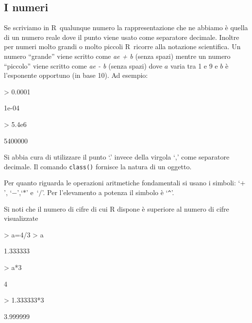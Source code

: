 \documentclass[onecolumn,11pt]{book}
\newcommand{\varia}[1]{\textsl{\textsf{#1}}}
\newcommand{\rpr}{\textsf{R}~}
\begin{document}
\subsection{I numeri}
Se scriviamo in \rpr qualunque numero la rappresentazione che ne abbiamo \`e quella di un numero reale dove  il punto viene usato come separatore decimale. Inoltre per numeri molto grandi o molto piccoli \rpr ricorre alla notazione scientifica. Un numero  ``grande''  viene scritto come
\varia{ae + b} (senza spazi) mentre un numero  ``piccolo'' viene scritto come
\varia{ae - b} (senza spazi)
dove $a$ varia tra 1 e 9 e $b$  \`e l'esponente opportuno (in base 10). Ad esempio:
\begin{Schunk}
\begin{Sinput}
> 0.0001
\end{Sinput}
\begin{Soutput}
[1] 1e-04
\end{Soutput}
\begin{Sinput}
> 5.4e6
\end{Sinput}
\begin{Soutput}
[1] 5400000
\end{Soutput}
\end{Schunk}
Si abbia cura di utilizzare il punto `.' invece della virgola `,'  come separatore decimale.  Il comando \texttt{class()} fornisce la natura di un oggetto.

Per quanto riguarda le operazioni aritmetiche fondamentali si usano i simboli:
`$+$', `$-$',`$*$' e~`$/$'. Per l'elevamento a potenza il simbolo  \`e `\texttt{\^}'.

Si noti  che il numero di cifre di cui \textsf{R} dispone  \`e superiore al numero di cifre visualizzate
\begin{Schunk}
\begin{Sinput}
> a=4/3
> a
\end{Sinput}
\begin{Soutput}
[1] 1.333333
\end{Soutput}
\begin{Sinput}
> a*3
\end{Sinput}
\begin{Soutput}
[1] 4
\end{Soutput}
\begin{Sinput}
> 1.333333*3
\end{Sinput}
\begin{Soutput}
[1] 3.999999
\end{Soutput}
\end{Schunk}
\end{document}
